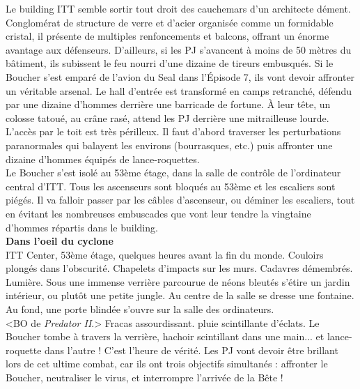 \documentclass[11pt,twoside,a4paper]{book}
\begin{document}
Le building ITT semble sortir tout droit des cauchemars d'un architecte d{\'e}ment. Conglom{\'e}rat de structure de verre et d'acier organis{\'e}e comme un formidable cristal, il pr{\'e}sente de multiples renfoncements et balcons, offrant un {\'e}norme avantage aux d{\'e}fenseurs. D'ailleurs, si les PJ s'avancent {\`a} moins de 50 m{\`e}tres du b{\^a}timent, ils subissent le feu nourri d'une dizaine de tireurs embusqu{\'e}s. Si le Boucher s'est empar{\'e} de l'avion du Seal dans l'{\'E}pisode 7, ils vont devoir affronter un v{\'e}ritable arsenal. Le hall d'entr{\'e}e est transform{\'e} en camps retranch{\'e}, d{\'e}fendu par une dizaine d'hommes derri{\`e}re une barricade de fortune. {\`A} leur t{\^e}te, un colosse tatou{\'e}, au cr{\^a}ne ras{\'e}, attend les PJ derri{\`e}re une mitrailleuse lourde. L'acc{\`e}s par le toit est tr{\`e}s p{\'e}rilleux. Il faut d'abord traverser les perturbations paranormales qui balayent les environs (bourrasques, etc.) puis affronter une dizaine d'hommes {\'e}quip{\'e}s de lance-roquettes.~\\

Le Boucher s'est isol{\'e} au 53{\`e}me {\'e}tage, dans la salle de contr{\^o}le de l'ordinateur central d'ITT. Tous les ascenseurs sont bloqu{\'e}s au 53{\`e}me et les escaliers sont pi{\'e}g{\'e}s. Il va falloir passer par les c{\^a}bles d'ascenseur, ou d{\'e}miner les escaliers, tout en {\'e}vitant les nombreuses embuscades que vont leur tendre la vingtaine d'hommes r{\'e}partis dans le building.~\\

\textbf{\large Dans l'oeil du cyclone}~\\

ITT Center, 53{\`e}me {\'e}tage, quelques heures avant la fin du monde. Couloirs plong{\'e}s dans l'obscurit{\'e}. Chapelets d'impacts sur les murs. Cadavres d{\'e}membr{\'e}s. Lumi{\`e}re. Sous une immense verri{\`e}re parcourue de n{\'e}ons bleut{\'e}s s'{\'e}tire un jardin int{\'e}rieur, ou plut{\^o}t une petite jungle. Au centre de la salle se dresse une fontaine. Au fond, une porte blind{\'e}e s'ouvre sur la salle des ordinateurs.~\\

<BO de \emph{Predator II}.> Fracas assourdissant. pluie scintillante d'{\'e}clats. Le Boucher tombe {\`a} travers la verri{\`e}re, hachoir scintillant dans une main... et lance-roquette dans l'autre ! C'est l'heure de v{\'e}rit{\'e}. Les PJ vont devoir {\^e}tre brillant lors de cet ultime combat, car ils ont trois objectifs simultan{\'e}s : affronter le Boucher, neutraliser le virus, et interrompre l'arriv{\'e}e de la B{\^e}te !~\\
\end{document}
